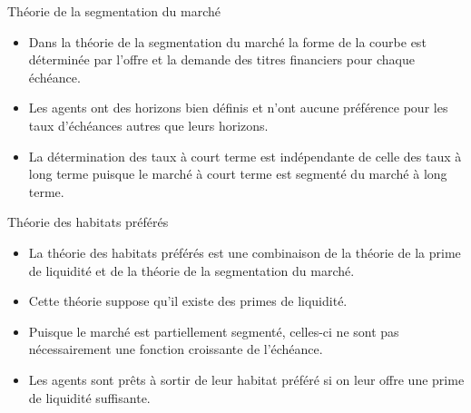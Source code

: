 \documentclass[11pt]{beamer}
\begin{document}
\begin{frame}{Théorie de la segmentation du marché}
\begin{itemize}
\item Dans la théorie de la segmentation du marché la forme de la courbe est déterminée par l’offre et la demande des titres financiers pour chaque échéance.  
\item Les agents ont des horizons bien définis et n’ont aucune préférence pour les taux d’échéances autres que leurs horizons. 
\item La détermination des taux à court terme est indépendante de celle des taux à long terme puisque le marché à court terme est segmenté du marché à long terme.
\end{itemize}
\end{frame}
\begin{frame}{Théorie des habitats préférés}
\begin{itemize}
\item La théorie des habitats préférés est une combinaison de la théorie de la prime de liquidité et de la théorie de la segmentation du marché. 
\item Cette théorie suppose qu'il existe des primes de liquidité.
\item Puisque le marché est partiellement segmenté,  celles-ci ne sont pas nécessairement une fonction croissante de l’échéance.
\item Les agents sont prêts à sortir de leur habitat préféré si on leur offre une prime de liquidité suffisante.
\end{itemize}
\end{frame}
\end{document}
